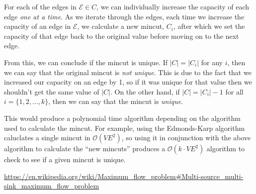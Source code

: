 \documentclass[addpoints]{exam}
\begin{document}
\begin{questions}
\begin{solution}
For each of the edges in $\mathcal{E}\in C$, we can individually increase the capacity of each edge {\em one at a time}. As we iterate through the edges, each time we increase the capacity of an edge in $\mathcal{E}$, we calculate a new mincut, $C_{i}$, after which we set the capacity of that edge back to the original value before moving on to the next edge. 

From this, we can conclude if the mincut is unique. If $\left| C \right| = \left| C_{i}\right|$ for any $i$, then we can say that the original mincut is {\em not unique}. This is due to the fact that we increased our capacity on an edge by 1, so if it was unique for that value then we shouldn't get the same value of $\left| C\right|$. On the other hand, if $\left| C \right| = \left| C_{i}\right| - 1$ for all $i = \{1, 2, \ldots, k\}$, then we can say that the mincut is {\em unique}.

This would produce a polynomial time algorithm depending on the algorithm used to calculate the mincut. For example, using the Edmonds-Karp algorithm caluclates a single mincut in $\mathcal{O}\left( VE^{2}\right)$, so using it in conjunction with the above algorithm to calculate the ``new mincuts'' produces a $\mathcal{O}\left( k\cdot VE^{2}\right)$ algorithm to check to see if a given mincut is unique.
\end{solution}

\end{questions}

\begin{thebibliography}{99}
\url{https://en.wikipedia.org/wiki/Maximum_flow_problem#Multi-source_multi-sink_maximum_flow_problem}
\end{thebibliography}
\end{document}
